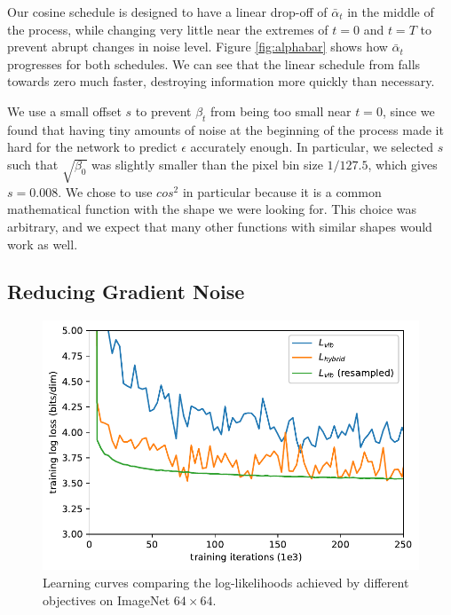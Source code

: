 \documentclass{article}
\begin{document}
Our cosine schedule is designed to have a linear drop-off of $\bar{\alpha}_t$ in the middle of the process, while changing very little near the extremes of $t=0$ and $t=T$ to prevent abrupt changes in noise level. Figure \ref{fig:alphabar} shows how $\bar{\alpha}_t$ progresses for both schedules. We can see that the linear schedule from \citet{ddpm} falls towards zero much faster, destroying information more quickly than necessary.

We use a small offset $s$ to prevent $\beta_t$ from being too small near $t=0$, since we found that having tiny amounts of noise at the beginning of the process made it hard for the network to predict $\epsilon$ accurately enough. In particular, we selected $s$ such that $\sqrt{\beta_0}$ was slightly smaller than the pixel bin size $1/127.5$, which gives $s=0.008$. We chose to use $cos^2$ in particular because it is a common mathematical function with the shape we were looking for. This choice was arbitrary, and we expect that many other functions with similar shapes would work as well.

\subsection{Reducing Gradient Noise}
\label{sec:gradnoise}

\begin{figure}[ht]
\begin{center}
\centerline{\includegraphics[width=0.8\columnwidth]{reweight_loss_curves-eps.pdf}}
\caption{\label{fig:reweightlosscurves} Learning curves comparing the log-likelihoods achieved by different objectives on ImageNet $64 \times 64$.}
\end{center}
\vskip -0.4in
\end{figure}
\end{document}

